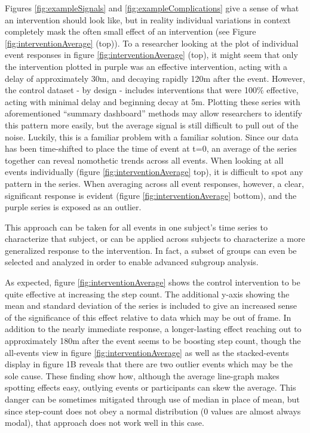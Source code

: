 Figures \ref{fig:exampleSignals} and \ref{fig:exampleComplications} give a sense of what an intervention should look like, but in reality individual variations in context completely mask the often small effect of an intervention (see Figure \ref{fig:interventionAverage} (top)).
To a researcher looking at the plot of individual event responses in figure \ref{fig:interventionAverage} (top), it might seem that only the intervention plotted in purple was an effective intervention, acting with a delay of approximately 30m, and decaying rapidly 120m after the event.
However, the control dataset - by design - includes interventions that were 100\% effective, acting with minimal delay and beginning decay at 5m.
Plotting these series with aforementioned ``summary dashboard'' methods may allow researchers to identify this pattern more easily, but the average signal is still difficult to pull out of the noise.
Luckily, this is a familiar problem with a familiar solution.
Since our data has been time-shifted to place the time of event at t=0, an average of the series together can reveal nomothetic trends across all events.
When looking at all events individually (figure \ref{fig:interventionAverage} top), it is difficult to spot any pattern in the series.
When averaging across all event responses, however, a clear, significant response is evident (figure \ref{fig:interventionAverage} bottom), and the purple series is exposed as an outlier.

This approach can be taken for all events in one subject's time series to characterize that subject, or can be applied across subjects to characterize a more generalized response to the intervention.
In fact, a subset of groups can even be selected and analyzed in order to enable advanced subgroup analysis.

As expected, figure \ref{fig:interventionAverage} shows the control intervention to be quite effective at increasing the step count.
The additional y-axis showing the mean and standard deviation of the series is included to give an increased sense of the significance of this effect relative to data which may be out of frame.
In addition to the nearly immediate response, a longer-lasting effect reaching out to approximately 180m after the event seems to be boosting step count, though the all-events view in figure \ref{fig:interventionAverage} as well as the stacked-events display in figure 1B reveals that there are two outlier events which may be the sole cause.
These finding show how, although the average line-graph makes spotting effects easy, outlying events or participants can skew the average.
This danger can be sometimes mitigated through use of median in place of mean, but since step-count does not obey a normal distribution (0 values are almost always modal), that approach does not work well in this case.

